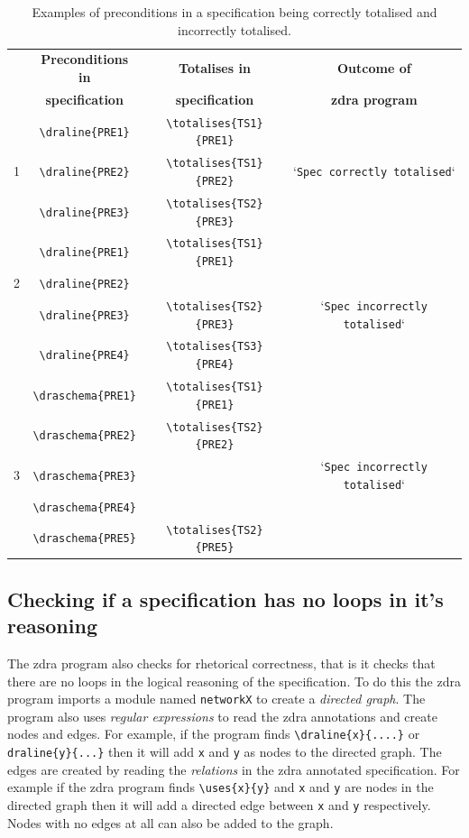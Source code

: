 \begin{table}[H]
\begin{tabular}{|c|c|c|c|}
\hline
& \textbf{Preconditions in} & \textbf{Totalises in} & \textbf{Outcome of} \\
& \textbf{specification} & \textbf{specification} & \textbf{\gls{zdra} program} \\
\hline
\hline
& \verb|\draline{PRE1}| & \verb|\totalises{TS1}{PRE1}| & \\
1 & \verb|\draline{PRE2}| & \verb|\totalises{TS1}{PRE2}| & `\texttt{Spec correctly totalised}` \\
& \verb|\draline{PRE3}| & \verb|\totalises{TS2}{PRE3}|& \\
\hline
& \verb|\draline{PRE1}| & \verb|\totalises{TS1}{PRE1}| &  \\
2 & \verb|\draline{PRE2}| & & \\
& \verb|\draline{PRE3}| & \verb|\totalises{TS2}{PRE3}|& `\texttt{Spec incorrectly totalised}` \\
& \verb|\draline{PRE4}| & \verb|\totalises{TS3}{PRE4}|& \\
\hline
& \verb|\draschema{PRE1}| & \verb|\totalises{TS1}{PRE1}| &  \\
 & \verb|\draschema{PRE2}| & \verb|\totalises{TS2}{PRE2}| & \\
3 & \verb|\draschema{PRE3}| & & `\texttt{Spec incorrectly totalised}` \\
& \verb|\draschema{PRE4}| & & \\
& \verb|\draschema{PRE5}| & \verb|\totalises{TS2}{PRE5}|& \\
\hline
\end{tabular}
\caption{\label{tab:totalisecorrect} Examples of preconditions in a specification being correctly totalised and incorrectly totalised.}
\end{table}

\subsection{Checking if a specification has no loops in it's reasoning}
\label{subsec:loops}

The \gls{zdra} program also checks for rhetorical correctness, that is it checks that there are no loops in the logical reasoning of the specification. To do this the \gls{zdra} program imports a module named \texttt{networkX} to create a \emph{directed graph}. The program also uses \emph{regular expressions} to read the \gls{zdra} annotations and create nodes and edges. For example, if the program finds \verb|\draline{x}{....}| or \verb|draline{y}{...}| then it will add \texttt{x} and \texttt{y} as nodes to the directed graph. The edges are created by reading the \emph{relations} in the \gls{zdra} annotated specification. For example if the \gls{zdra} program finds \verb|\uses{x}{y}| and \texttt{x} and \texttt{y} are nodes in the directed graph then it will add a directed edge between \texttt{x} and \texttt{y} respectively. Nodes with no edges at all can also be added to the graph.

